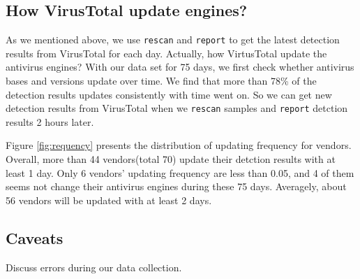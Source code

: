 

\subsection{How VirusTotal update engines?}
As we mentioned above, we use \texttt{rescan} and \texttt{report} to get the latest detection results from VirusTotal for each day. Actually, how VirtusTotal update the antivirus engines? With our data set for 75 days, we first check whether antivirus bases and versions update over time. We find that more than 78\% of the detection results updates consistently with time went on. So we can get new detection results from VirusTotal when we \texttt{rescan} samples and \texttt{report} detction results 2 hours later.




Figure \ref{fig:requency} presents the distribution of updating frequency for vendors. Overall, more than 44 vendors(total 70) update their detction results with at least 1 day. Only 6 vendors' updating frequency are less than 0.05, and 4 of them seems not change their antivirus engines during these 75 days. Averagely, about 56 vendors will be updated with at least 2 days. 

\subsection{Caveats}

Discuss errors during our data collection. 
